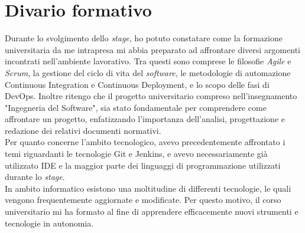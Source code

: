 \section{Divario formativo}
Durante lo svolgimento dello \emph{stage}, ho potuto constatare come la formazione universitaria da me intrapresa mi abbia preparato ad affrontare diversi argomenti incontrati nell'ambiente lavorativo.
Tra questi sono comprese le filosofie \emph{Agile} e \emph{Scrum}, la gestione del ciclo di vita del \emph{software}, le metodologie di automazione \gls{Continuous Integration} e \gls{Continuous Deployment}, e lo scopo delle fasi di \gls{DevOps}.
Inoltre ritengo che il progetto universitario compreso nell'insegnamento "Ingegneria del Software", sia stato fondamentale per comprendere come affrontare un progetto, enfatizzando l'importanza dell'analisi, progettazione e redazione dei relativi documenti normativi.\\
Per quanto concerne l'ambito tecnologico, avevo precedentemente affrontato i temi riguardanti le tecnologie Git e Jenkins, e avevo necessariamente già utilizzato IDE e la maggior parte dei linguaggi di programmazione utilizzati durante lo \emph{stage}.\\ 
In ambito informatico esistono una moltitudine di differenti tecnologie, le quali vengono frequentemente aggiornate e modificate. 
Per questo motivo, il corso universitario mi ha formato al fine di apprendere efficacemente nuovi strumenti e tecnologie in autonomia. 
